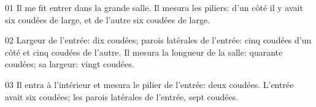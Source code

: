 01 Il me fit entrer dans la grande salle. Il mesura les piliers: d’un côté il y avait six coudées de large, et de l’autre six coudées de large.

02 Largeur de l’entrée: dix coudées; parois latérales de l’entrée: cinq coudées d’un côté et cinq coudées de l’autre. Il mesura la longueur de la salle: quarante coudées; sa largeur: vingt coudées.

03 Il entra à l’intérieur et mesura le pilier de l’entrée: deux coudées. L’entrée avait six coudées; les parois latérales de l’entrée, sept coudées.
